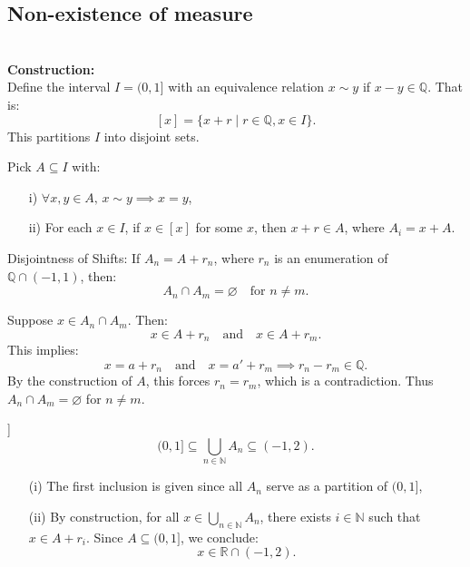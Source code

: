 \begin{prf}
\subsection{Non-existence of measure}
\label{proof: non-existence}
\begin{prf*}\\
\textbf{Construction:}\\
Define the interval \( I = (0, 1] \) with an equivalence relation \( x \sim y \) if \( x - y \in \mathbb{Q} \). That is:
\[
[x] = \{x + r \mid r \in \mathbb{Q}, x \in I\}.
\]
This partitions \( I \) into disjoint sets.

\noindent Pick \( A \subseteq I \) with:
\begin{enumerate}
    \item[i)] \(\forall x, y \in A, \, x \sim y \implies x = y\),
    \item[ii)] For each \( x \in I \), if \( x \in [x] \) for some \( x \), then \( x + r \in A \), where \( A_i = x + A \).
\end{enumerate}

\begin{clm}Disjointness of Shifts: If \( A_n = A + r_n \), where \( r_n \) is an enumeration of \( \mathbb{Q} \cap (-1, 1) \), then:
\[
A_n \cap A_m = \varnothing \quad \text{for } n \neq m.
\]
\end{clm}

\noindent Suppose \( x \in A_n \cap A_m \). Then:
\[
x \in A + r_n \quad \text{and} \quad x \in A + r_m.
\]
This implies:
\[
x = a + r_n \quad \text{and} \quad x = a' + r_m \implies r_n - r_m \in \mathbb{Q}.
\]
By the construction of \( A \), this forces \( r_n = r_m \), which is a contradiction. Thus \( A_n \cap A_m = \varnothing \) for \( n \neq m \).

\begin{clm}[Covering of \((0, 1]\)]
\[
(0, 1] \subseteq \bigcup_{n \in \mathbb{N}} A_n \subseteq (-1, 2).
\]
\end{clm}

\begin{enumerate}
    \item[(i)] The first inclusion is given since all \( A_n \) serve as a partition of \((0, 1]\),
    \item[(ii)] By construction, for all \( x \in \bigcup_{n \in \mathbb{N}} A_n \), there exists \( i \in \mathbb{N} \) such that \( x \in A + r_i \). Since \( A \subseteq (0, 1] \), we conclude:
    \[
    x \in \mathbb{R} \cap (-1, 2).
    \]
\end{enumerate}


\end{prf*}
\end{prf}
